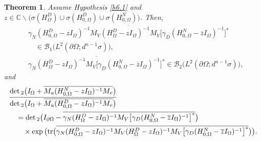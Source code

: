 \documentclass[reqno,10pt, centertags]{amsart}
\newcommand{\bbC}{{\mathbb{C}}}
\newcommand{\cB}{{\mathcal B}}
\newcommand{\no}{\nonumber}
\newcommand{\lb}{\label}
\newcommand{\ol}{\overline}
\newcommand{\ga}{\gamma}
\newcommand{\si}{\sigma}
\newcommand{\Om}{\Omega}
\newcommand{\dOm}{{\partial\Omega}}
\newcommand{\tr}{\text{\rm{tr}}}
\numberwithin{equation}{section}
\newtheorem{theorem}{Theorem}[section]
\theoremstyle{definition}
\begin{document}
\begin{theorem} \lb{t6.5}
Assume Hypothesis \ref{h6.1} and
$z\in\bbC\backslash\big(\si(H_{\Om}^D)\cup
\si(H_{0,\Om}^D) \cup \si(H_{0,\Om}^N)\big)$. Then,
\begin{align}
&\ol{\ga_N(H_{0,\Om}^D-zI_{\Om})^{-1}M_V
(H_{\Om}^D-zI_{\Om})^{-1}M_V
\big[\ga_D(H_{0,\Om}^N-\ol{z}I_{\Om})^{-1}\big]^*}
\no  \\
& \quad
\in\cB_1\big(L^2(\dOm;d^{n-1}\si)\big),  \lb{6.70a}  \\
&\ol{\ga_N(H_{\Om}^D-zI_{\Om})^{-1}M_V
\big[\ga_D(H_{0,\Om}^N-\ol{z}I_{\Om})^{-1}\big]^*}
\in\cB_2\big(L^2(\dOm;d^{n-1}\si)\big), \lb{6.70b}
\end{align}
and
\begin{align}
& \frac{\det{}_2\big(I_{\Om}+\ol{M_u(H_{0,\Om}^N-zI_{\Om})^{-1}M_v}\big)}
{\det{}_2\big(I_{\Om}+\ol{M_u(H_{0,\Om}^D-zI_{\Om})^{-1}M_v}\big)}  \no \\
&\quad = \det{}_2\big(I_{\dOm} -
\ol{\ga_N(H_{\Om}^D-zI_{\Om})^{-1}M_V
\big[\ga_D(H_{0,\Om}^N-\ol{z}I_{\Om})^{-1}\big]^*}\big)
\lb{6.31} \\
&\quad\quad \times \exp\big(\tr\big(
\ol{\ga_N(H_{0,\Om}^D-zI_{\Om})^{-1}M_V
(H_{\Om}^D-zI_{\Om})^{-1}M_V
\big[\ga_D(H_{0,\Om}^N-\ol{z}I_{\Om})^{-1}\big]^*}
\big)\big). \no
\end{align}
\end{theorem}
\end{document}
